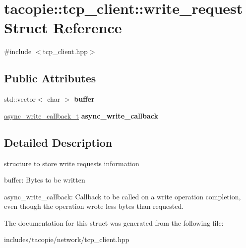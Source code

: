 \hypertarget{structtacopie_1_1tcp__client_1_1write__request}{}\section{tacopie\+:\+:tcp\+\_\+client\+:\+:write\+\_\+request Struct Reference}
\label{structtacopie_1_1tcp__client_1_1write__request}


{\ttfamily \#include $<$tcp\+\_\+client.\+hpp$>$}

\subsection*{Public Attributes}
\begin{DoxyCompactItemize}
\item 
\mbox{\label{structtacopie_1_1tcp__client_1_1write__request_a4ee0c159b630c14f81d6b6d7d4b4e826}} 
std\+::vector$<$ char $>$ {\bfseries buffer}
\item 
\mbox{\label{structtacopie_1_1tcp__client_1_1write__request_a04fd3e5484ba322d0112024bf8823623}} 
\hyperlink{classtacopie_1_1tcp__client_ad48b8c8dff8a77490eb2e3e802c82b97}{async\+\_\+write\+\_\+callback\+\_\+t} {\bfseries async\+\_\+write\+\_\+callback}
\end{DoxyCompactItemize}


\subsection{Detailed Description}
structure to store write requests information
\begin{DoxyItemize}
\item buffer\+: Bytes to be written
\item async\+\_\+write\+\_\+callback\+: Callback to be called on a write operation completion, even though the operation wrote less bytes than requested. 
\end{DoxyItemize}

The documentation for this struct was generated from the following file\+:\begin{DoxyCompactItemize}
\item 
includes/tacopie/network/tcp\+\_\+client.\+hpp\end{DoxyCompactItemize}
